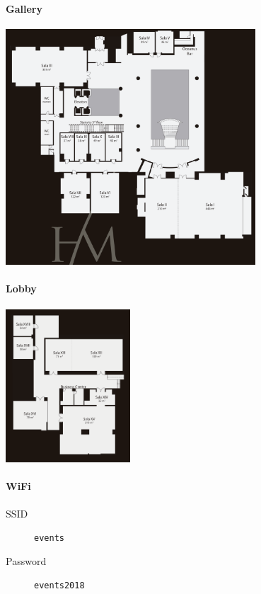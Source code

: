 \label{Floorplan}

\paragraph{Gallery}
\begin{center}
  \includegraphics[width=0.7\textwidth]{img/gallery}
\end{center}

\paragraph{Lobby}
\begin{center}
  \includegraphics[width=0.35\textwidth]{img/lobby}
\end{center}

\vfil
\paragraph{WiFi}
\begin{description}
\item[SSID] \texttt{events}
\item[Password] \texttt{events2018}
\end{description}
\vfil
\eject

\newpage

